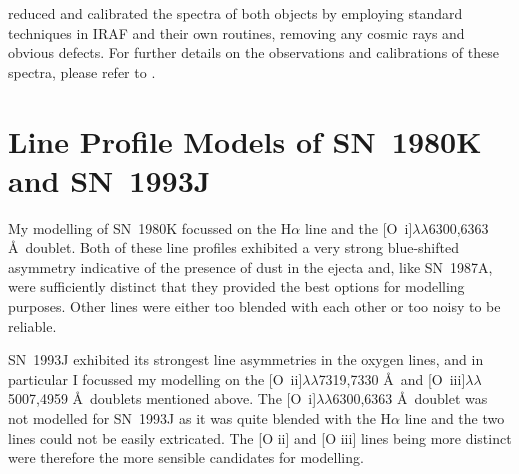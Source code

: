\citet{Milisavljevic2012} reduced and calibrated the spectra of both objects by employing
standard techniques in IRAF and their own routines, removing any cosmic rays and obvious defects. For further details on the observations and calibrations of these spectra, please refer to \citet{Milisavljevic2012}. 




\section{Line Profile Models of SN~1980K and SN~1993J}
\label{80K_93J_models}
My modelling of SN~1980K focussed on the H$\alpha$ line and the [O~{\sc i}]$\lambda\lambda$6300,6363 \AA\  doublet.  Both of these line profiles exhibited a very strong blue-shifted asymmetry indicative of the presence of dust in the ejecta and, like SN~1987A, were sufficiently distinct that they provided the best options for modelling purposes.  Other lines were either too blended with each other or too noisy to be reliable.  

SN~1993J exhibited its strongest line asymmetries in the oxygen lines, and in particular I focussed my modelling on the [O~{\sc ii}]$\lambda\lambda$7319,7330 \AA\  and [O~{\sc iii}]$\lambda\lambda$5007,4959 \AA\  doublets mentioned above.  The [O~{\sc i}]$\lambda\lambda$6300,6363 \AA\ doublet was not modelled for SN~1993J as it was quite blended with the H$\alpha$ line and the two lines could not be easily extricated.  The [O {\sc ii}] and [O {\sc iii}] lines being more distinct were therefore the more sensible candidates for modelling.

